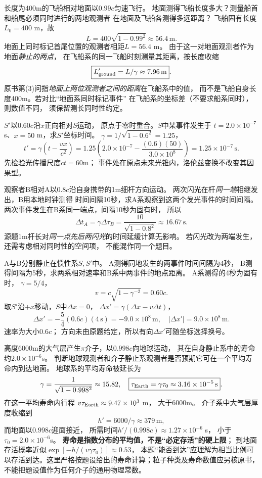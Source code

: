 \problemtext 长度为400m的飞船相对地面以$0.99c$匀速飞行。
地面测得飞船长度多大？测量船首和船尾必须同时进行的两地观测者
在地面及飞船各测得多远距离？
\workings
飞船固有长度$L_0=400$ m，故
\[
\boxed{L=400\sqrt{1-0.99^2}\approx56.4\,\mathrm m}.
\]
地面上同时标记首尾位置的观测者相距$L=56.4$ m。
由于这一对地面观测者作为地面\emph{静止的两点}，
在飞船系的同一飞船时刻测量其距离，按长度收缩
\[
\boxed{L'_{\rm ground}=L/\gamma\approx7.96\,\mathrm m}.
\]
\crosscheck 原书第(3)问指\emph{地面上两位观测者之间的距离}在飞船系中的值，
而不是飞船自身长度400m。若对比“地面系同时标记事件”
在飞船系的坐标差（不要求船系同时），则数值不同，
须保留测长同时性约定。

\problemtext $S'$以$0.60c$沿$x$正向相对$S$运动，
原点于零时重合。$S$中某事件发生于
$t=2.0\times10^{-7}$ s、$x=50$ m，求$S'$坐标时间。
\workings
$\gamma=1/\sqrt{1-0.6^2}=1.25$，
\[
\boxed{t'=\gamma\left(t-\frac{vx}{c^2}\right)
=1.25\left(2.0\times10^{-7}
-\frac{(0.6)(50)}{3.0\times10^8}\right)
=1.25\times10^{-7}\,\mathrm s}.
\]
\crosscheck 先检验光传播尺度$ct=60$m；
事件处在原点未来光锥内，洛伦兹变换不改变其因果型。

\problemtext 观察者B相对A以$0.8c$沿自身携带的1m细杆方向运动。
两次闪光在杆\emph{同一端}相继发出，B用本地时钟测得
时间间隔10秒，求A系观察到这两个发光事件的时间间隔。
\workings
两次事件发生在B系同一端点，间隔10秒为固有时，
所以
\[
\boxed{\Delta t_A=\gamma\Delta\tau_B
=\frac{10}{\sqrt{1-0.8^2}}\approx16.67\,\mathrm s}.
\]
\crosscheck 源题1m杆长对\emph{同一点先后两闪光}的时间延缓计算无影响。
若闪光改为两端发生，还需考虑相对同时性的空间项，
不能混作同一个题目。

\problemtext A与B分别静止在惯性系$S,S'$中。
A测得同地发生的两事件时间间隔为4秒，
B测得间隔为5秒，求两系相对速率和B系中两事件的地点距离。
\workings
A系测得的4秒为固有时，
$\gamma=5/4$，
\[
\boxed{v=c\sqrt{1-\gamma^{-2}}=0.60c}.
\]
取$S'$沿$+x$移动，$S$中$\Delta x=0$，
$\Delta x'=\gamma(\Delta x-v\Delta t)$，
\[
\boxed{\Delta x'=-\frac54(0.6c)(4\,\mathrm s)
=-9.0\times10^8\,\mathrm m},\quad
\boxed{|\Delta x'|=9.0\times10^8\,\mathrm m}.
\]
\crosscheck 速率为大小$0.6c$；
方向未由原题给定，所以有向$\Delta x'$可随坐标选择换号。

\problemtext 高度6000m的大气层产生$\pi$介子，以$0.998c$向地球运动，
其在自身静止系中的寿命约$2.0\times10^{-6}$s。
判断地球观测者和介子静止系观测者是否预期它可在一个平均寿命内到达地面。
\workings
地球系的平均寿命被延长为
\[
\gamma=\frac1{\sqrt{1-0.998^2}}\approx15.82,
\quad
\boxed{\tau_{\rm Earth}=\gamma\tau_0\approx3.16\times10^{-5}\,\mathrm s}.
\]
在这一平均寿命内行程
$v\tau_{\rm Earth}\approx9.47\times10^3$ m，
大于6000m。
介子系中大气层厚度收缩到
\[
\boxed{h'=6000/\gamma\approx379\,\mathrm m},
\]
而地面以$0.998c$迎面接近，
所需时间$h'/(0.998c)\approx1.27\times10^{-6}$ s，
小于$\tau_0=2.0\times10^{-6}$s。
\crosscheck \textbf{寿命是指数分布的平均值，不是“必定存活”的硬上限}；
到地面存活概率近似$\exp[-h/(v\gamma\tau_0)]\approx0.53$，
本题“能否到达”应理解为相当比例可以存活到达。这里严格按题设给出的寿命计算；粒子种类及寿命数值应另核原书，不能把题设值作为任何介子的通用物理常数。

